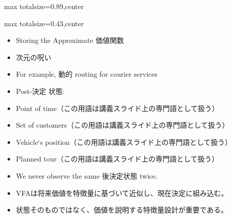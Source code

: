 \begin{minipage}[t]{0.58\textwidth}
\begin{adjustbox}{max totalsize={\textwidth}{0.89\textheight},center}
\begin{minipage}{\textwidth}
\end{minipage}
\end{adjustbox}
\end{minipage}


\clearpage
{}
\begin{minipage}[t]{0.405\textwidth}
\begin{adjustbox}{max totalsize={\textwidth}{0.43\textheight},center}
\begin{minipage}{\textwidth}\scriptsize
{}\begin{itemize}
\item Storing the Approximate 価値関数
\item 次元の呪い
\item For example, 動的 routing for courier services
\item Post-決定 状態:
\item Point of time（この用語は講義スライド上の専門語として扱う）
\item Set of customers（この用語は講義スライド上の専門語として扱う）
\item Vehicle‘s position（この用語は講義スライド上の専門語として扱う）
\item Planned tour（この用語は講義スライド上の専門語として扱う）
\item We never observe the same 後決定状態 twice.
\end{itemize}\begin{itemize}
\item VFAは将来価値を特徴量に基づいて近似し、現在決定に組み込む。
\item 状態そのものではなく、価値を説明する特徴量設計が重要である。
\end{itemize}
\end{minipage}
\end{adjustbox}
\end{minipage}\hfill
